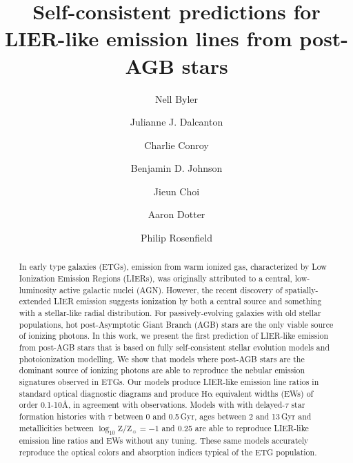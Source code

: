\documentclass[preprint2]{aastex62}
\newcommand{\ha}{\ensuremath{\mathrm{H\alpha}}\xspace}
\newcommand{\logten}{\ensuremath{\log_{10}}}
\newcommand{\logZeq}[1]{\ensuremath{\logten \mathrm{Z}/\mathrm{Z}_{\sun} = #1}}
\newcommand{\ang}{\ensuremath{\mbox{\AA}}\xspace}
\newcommand{\Gyr}{$\,$Gyr\xspace}
\begin{document}
\title{Self-consistent predictions for LIER-like emission lines from post-AGB stars}
\author[0000-0002-7392-3637]{Nell Byler}
\author[0000-0002-1264-2006]{Julianne J. Dalcanton}
\author[0000-0002-1590-8551]{Charlie Conroy}
\author{Benjamin D. Johnson}
\author{Jieun Choi}
\author{Aaron Dotter}
\author[0000-0001-9306-6049]{Philip Rosenfield}
\begin{abstract}

In early type galaxies (ETGs), emission from warm ionized gas, characterized by Low Ionization Emission Regions (LIERs), was originally attributed to a central, low-luminosity active galactic nuclei (AGN). However, the recent discovery of spatially-extended LIER emission suggests ionization by both a central source and something with a stellar-like radial distribution. For passively-evolving galaxies with old stellar populations, hot post-Asymptotic Giant Branch (AGB) stars are the only viable source of ionizing photons. In this work, we present the first prediction of LIER-like emission from post-AGB stars that is based on fully self-consistent stellar evolution models and photoionization modelling. We show that models where post-AGB stars are the dominant source of ionizing photons are able to reproduce the nebular emission signatures observed in ETGs. Our models produce LIER-like emission line ratios in standard optical diagnostic diagrams and produce \ha equivalent widths (EWs) of order 0.1-10\ang, in agreement with observations. Models with with delayed-$\tau$ star formation histories with $\tau$ between 0 and 0.5\Gyr, ages between 2 and 13\Gyr and metallicities between \logZeq{-1} and 0.25 are able to reproduce LIER-like emission line ratios and EWs without any tuning. These same models accurately reproduce the optical colors and absorption indices typical of the ETG population.%

\end{abstract}
\end{document}
